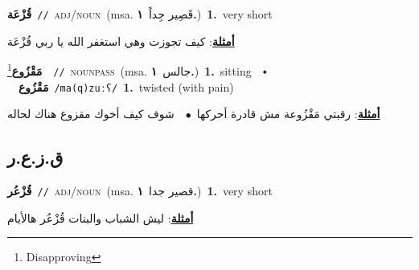 \documentclass[10pt,a4paper,twoside]{article} %
\begin{document}
\begin{multicols}{2}
{\setlength\topsep{0pt}\textbf{\foreignlanguage{arabic}{قُزْعَة}}\ {\color{gray}\texttt{//}\color{black}}\ \textsc{adj/noun}\ \color{gray}(msa. \foreignlanguage{arabic}{قَصِير جِداً}~\foreignlanguage{arabic}{\textbf{١.}})\color{black}\ \textbf{1.}~very short\  \begin{flushright}\color{gray}\foreignlanguage{arabic}{\textbf{\underline{\foreignlanguage{arabic}{أمثلة}}}: كيف تجوزت وهي استغفر الله يا ربي قُزْعَة}\end{flushright}\color{black}} \vspace{2mm}

{\setlength\topsep{0pt}\textbf{\foreignlanguage{arabic}{مَقْزُوع}}\footnote{Disapproving}\ \ {\color{gray}\texttt{//}\color{black}}\ \textsc{noun\textunderscore pass}\ \color{gray}(msa. \foreignlanguage{arabic}{جالس}~\foreignlanguage{arabic}{\textbf{١.}})\color{black}\ \textbf{1.}~sitting\ \ $\smblkdiamond$\ \ \setlength\topsep{0pt}\textbf{\foreignlanguage{arabic}{مَقْزُوع}}\ {\color{gray}\texttt{/ma(q)zuːʕ/}\color{black}}\ \textbf{1.}~twisted (with pain)\  \begin{flushright}\color{gray}\foreignlanguage{arabic}{\textbf{\underline{\foreignlanguage{arabic}{أمثلة}}}: رقبتي مَقْزُوعة مش قادرة أحركها\ $\bullet$\ \  شوف كيف أخوك مقزوع هناك لحاله}\end{flushright}\color{black}} \vspace{2mm}

\vspace{-3mm}
\subsection*{\color{blue}\foreignlanguage{arabic}{ق.ز.ع.ر}\color{blue}{}} 

{\setlength\topsep{0pt}\textbf{\foreignlanguage{arabic}{قُزْعُر}}\ {\color{gray}\texttt{//}\color{black}}\ \textsc{adj/noun}\ \color{gray}(msa. \foreignlanguage{arabic}{قصير جدا}~\foreignlanguage{arabic}{\textbf{١.}})\color{black}\ \textbf{1.}~very short\  \begin{flushright}\color{gray}\foreignlanguage{arabic}{\textbf{\underline{\foreignlanguage{arabic}{أمثلة}}}: ليش الشباب والبنات قُزْعُر هالأيام}\end{flushright}\color{black}} \vspace{2mm}


\end{multicols}
\end{document}
